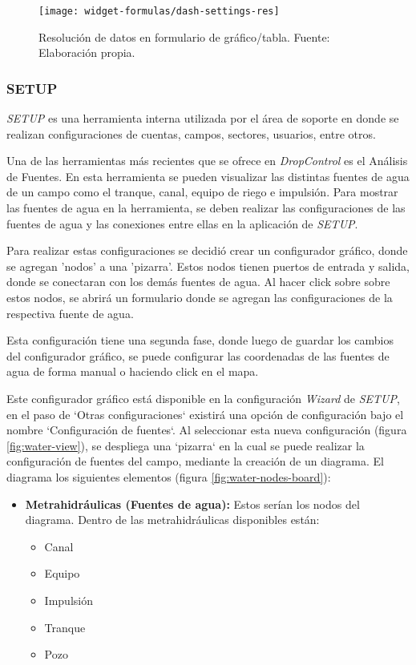 \begin{figure}[H]
	\centering
	\texttt{[image: widget-formulas/dash-settings-res]}
	\caption{\label{fig:dash-settings-res} Resolución de datos en formulario de gráfico/tabla. Fuente: Elaboración propia.}
\end{figure}

\iffalse
\subsubsection{SETUP}

\textit{SETUP} es una herramienta interna utilizada por el área de soporte en donde se realizan configuraciones de cuentas, campos, sectores, usuarios, entre otros.


Una de las herramientas más recientes que se ofrece en \textit{DropControl} es el Análisis de Fuentes. En esta herramienta se pueden visualizar las distintas fuentes de agua de un campo como el tranque, canal, equipo de riego e impulsión.
Para mostrar las fuentes de agua en la herramienta, se deben realizar las configuraciones de las fuentes de agua y las conexiones entre ellas en la aplicación de \textit{SETUP}.

Para realizar estas configuraciones se decidió crear un configurador gráfico, donde se agregan 'nodos' a una 'pizarra'. Estos nodos tienen puertos de entrada y salida, donde se conectaran con los demás fuentes de agua. Al hacer click sobre sobre estos nodos, se abrirá un formulario donde se agregan las configuraciones de la respectiva fuente de agua.

Esta configuración tiene una segunda fase, donde luego de guardar los cambios del configurador gráfico, se puede configurar las coordenadas de las fuentes de agua de forma manual o haciendo click en el mapa.

Este configurador gráfico está disponible en la configuración \textit{Wizard} de \textit{SETUP}, en el paso de `Otras configuraciones` existirá una opción de configuración bajo el nombre `Configuración de fuentes`.
Al seleccionar esta nueva configuración (figura \ref{fig:water-view}), se despliega una `pizarra` en la cual se puede realizar la configuración de fuentes del campo, mediante la creación de un diagrama. El diagrama los siguientes elementos (figura \ref{fig:water-nodes-board}):
\begin{itemize}
    \item \textbf{Metrahidráulicas (Fuentes de agua):} Estos serían los nodos del diagrama. Dentro de las metrahidráulicas disponibles están:
          \begin{itemize}
              \item Canal
              \item Equipo
              \item Impulsión
              \item Tranque
              \item Pozo
          \end{itemize}   
\end{itemize}

